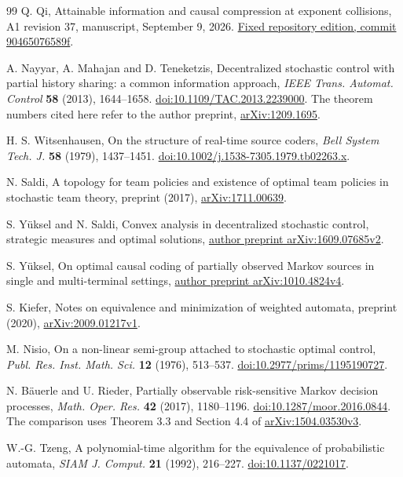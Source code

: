 \begin{thebibliography}{99}
Q. Qi, Attainable information and causal compression at exponent
collisions, A1 revision 37, manuscript, September 9, 2026.
\href{https://github.com/TrillionniumFoundation/theta-theory/tree/90465076589f5e5c69227d624f278c47744f1c1d}{Fixed repository edition, commit 90465076589f}.


A. Nayyar, A. Mahajan and D. Teneketzis,
Decentralized stochastic control with partial history sharing:
a common information approach,
\emph{IEEE Trans. Automat. Control} \textbf{58} (2013), 1644--1658.
\href{https://doi.org/10.1109/TAC.2013.2239000}{doi:10.1109/TAC.2013.2239000}.
The theorem numbers cited here refer to the author preprint,
\href{https://arxiv.org/abs/1209.1695}{arXiv:1209.1695}.

H. S. Witsenhausen, On the structure of real-time source coders,
\emph{Bell System Tech. J.} \textbf{58} (1979), 1437--1451.
\href{https://doi.org/10.1002/j.1538-7305.1979.tb02263.x}{doi:10.1002/j.1538-7305.1979.tb02263.x}.


N. Saldi, A topology for team policies and existence of optimal team
policies in stochastic team theory, preprint (2017),
\href{https://arxiv.org/abs/1711.00639}{arXiv:1711.00639}.

S. Y\"uksel and N. Saldi, Convex analysis in decentralized stochastic
control, strategic measures and optimal solutions,
\href{https://arxiv.org/abs/1609.07685v2}{author preprint arXiv:1609.07685v2}.

S. Y\"uksel, On optimal causal coding of partially observed Markov
sources in single and multi-terminal settings,
\href{https://arxiv.org/abs/1010.4824v4}{author preprint arXiv:1010.4824v4}.

S. Kiefer, Notes on equivalence and minimization of weighted automata,
preprint (2020),
\href{https://arxiv.org/abs/2009.01217v1}{arXiv:2009.01217v1}.

M. Nisio, On a non-linear semi-group attached to stochastic optimal
control, \emph{Publ. Res. Inst. Math. Sci.} \textbf{12} (1976), 513--537.
\href{https://doi.org/10.2977/prims/1195190727}{doi:10.2977/prims/1195190727}.

N. B\"auerle and U. Rieder, Partially observable risk-sensitive Markov
decision processes, \emph{Math. Oper. Res.} \textbf{42} (2017), 1180--1196.
\href{https://doi.org/10.1287/moor.2016.0844}{doi:10.1287/moor.2016.0844}.
The comparison uses Theorem 3.3 and Section 4.4 of
\href{https://arxiv.org/abs/1504.03530v3}{arXiv:1504.03530v3}.

W.-G. Tzeng, A polynomial-time algorithm for the equivalence of
probabilistic automata, \emph{SIAM J. Comput.} \textbf{21} (1992), 216--227.
\href{https://doi.org/10.1137/0221017}{doi:10.1137/0221017}.

\end{thebibliography}
